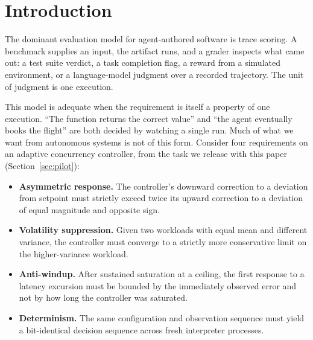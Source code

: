 \documentclass[conference]{IEEEtran}
\begin{document}
	\section{Introduction}
	
	The dominant evaluation model for agent-authored software is trace scoring.
	A benchmark supplies an input, the artifact runs, and a grader inspects what
	came out: a test suite verdict, a task completion flag, a reward from a
	simulated environment, or a language-model judgment over a recorded
	trajectory. The unit of judgment is one execution.
	
	This model is adequate when the requirement is itself a property of one
	execution. ``The function returns the correct value'' and ``the agent
	eventually books the flight'' are both decided by watching a single run.
	Much of what we want from autonomous systems is not of this form. Consider
	four requirements on an adaptive concurrency controller, from the task we
	release with this paper (Section~\ref{sec:pilot}):
	
	\begin{itemize}
		\item \textbf{Asymmetric response.} The controller's downward correction to
		a deviation from setpoint must strictly exceed twice its upward correction
		to a deviation of equal magnitude and opposite sign.
		\item \textbf{Volatility suppression.} Given two workloads with equal mean
		and different variance, the controller must converge to a strictly more
		conservative limit on the higher-variance workload.
		\item \textbf{Anti-windup.} After sustained saturation at a ceiling, the
		first response to a latency excursion must be bounded by the immediately
		observed error and not by how long the controller was saturated.
		\item \textbf{Determinism.} The same configuration and observation sequence
		must yield a bit-identical decision sequence across fresh interpreter
		processes.
	\end{itemize}
	
\end{document}
